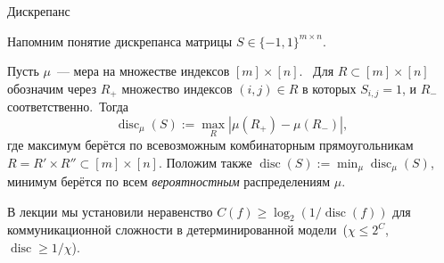 \documentclass[handout]{beamer}
\renewcommand\le{\leqslant}
\renewcommand\ge{\geqslant}
\DeclareMathOperator{\disc}{disc}
\begin{document}
\begin{frame}{Дискрепанс}

    Напомним понятие дискрепанса матрицы $S\in\{-1,1\}^{m\times n}$.
    \pause\vspace{5pt}

    Пусть $\mu$~--- мера на множестве индексов
    $[m]\times[n]$.\pause~
    Для $R\subset[m]\times[n]$ обозначим через $R_+$ множество индексов $(i,j)\in R$ в
    которых $S_{i,j}=1$, и $R_-$ соответственно.\pause~Тогда
    $$
    \disc_\mu(S) := \max_R|\mu(R_+)-\mu(R_-)|,
    $$
    где максимум берётся по всевозможным комбинаторным прямоугольникам
    $R=R'\times R''\subset [m]\times [n]$.
    \pause
    Положим также $\disc(S) := \min_\mu\disc_\mu(S)$, минимум берётся по всем
    \textit{вероятностным} распределениям $\mu$.
    \pause

    В лекции  мы установили неравенство $C(f)\ge\log_2(1/\disc(f))$ для коммуникационной сложности в
    детерминированной модели\pause~($\chi\le 2^C$, $\disc\ge 1/\chi$).
\end{frame}
\end{document}

